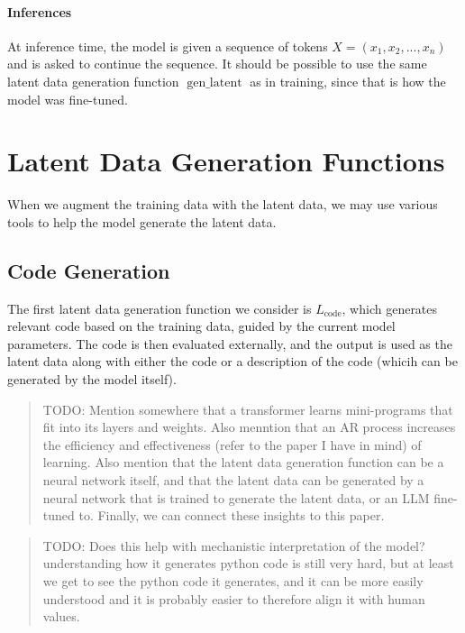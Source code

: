 \documentclass[
]{article}
\begin{document}
\hypertarget{inferences}{%
\paragraph{Inferences}\label{inferences}}

At inference time, the model is given a sequence of tokens
\(X = (x_1, x_2, ..., x_n)\) and is asked to continue the sequence. It
should be possible to use the same latent data generation function
\(\operatorname{gen\_latent}\) as in training, since that is how the
model was fine-tuned.

\hypertarget{latent-data-generation-functions}{%
\section{Latent Data Generation
Functions}\label{latent-data-generation-functions}}

When we augment the training data with the latent data, we may use
various tools to help the model generate the latent data.

\hypertarget{code-generation}{%
\subsection{Code Generation}\label{code-generation}}

The first latent data generation function we consider is
\(L_{\text{code}}\), which generates relevant code based on the training
data, guided by the current model parameters. The code is then evaluated
externally, and the output is used as the latent data along with either
the code or a description of the code (whicih can be generated by the
model itself).

\begin{quote}
TODO: Mention somewhere that a transformer learns mini-programs that fit
into its layers and weights. Also menntion that an AR process increases
the efficiency and effectiveness (refer to the paper I have in mind) of
learning. Also mention that the latent data generation function can be a
neural network itself, and that the latent data can be generated by a
neural network that is trained to generate the latent data, or an LLM
fine-tuned to. Finally, we can connect these insights to this paper.
\end{quote}

\begin{quote}
TODO: Does this help with mechanistic interpretation of the model?
understanding how it generates python code is still very hard, but at
least we get to see the python code it generates, and it can be more
easily understood and it is probably easier to therefore align it with
human values.
\end{quote}
\end{document}
